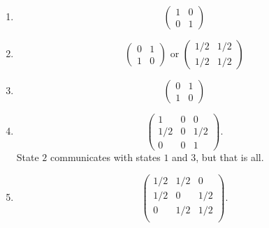 \documentclass[12pt]{article}
\begin{document}
\begin{solution}
    \begin{enumerate}[label=(\alph*)]
    \item
        \[
            \begin{pmatrix}
                1 & 0 \\
                0 & 1
            \end{pmatrix}
        \]
    \item
        \[
            \begin{pmatrix}
                0 & 1 \\
                1 & 0
            \end{pmatrix}
            \text{ or }
            \begin{pmatrix}
                1/2 & 1/2 \\
                1/2 & 1/2
            \end{pmatrix}
        \]
    \item
        \[
            \begin{pmatrix}
                0 & 1 \\
                1 & 0
            \end{pmatrix}
        \]
    \item
        \[
            \begin{pmatrix}
                1 & 0 & 0 \\
                1/2 & 0 & 1/2 \\
                0 &0 & 1
            \end{pmatrix}.
        \] State \( 2 \) communicates with states \( 1 \) and \( 3 \),
        but that is all.
    \item
        \[
            \begin{pmatrix}
                1/2 & 1/2 & 0 \\
                1/2 & 0 & 1/2 \\
                0 & 1/2 & 1/2 \\
            \end{pmatrix}.
        \]
\end{enumerate}
\end{solution}
\end{document}
